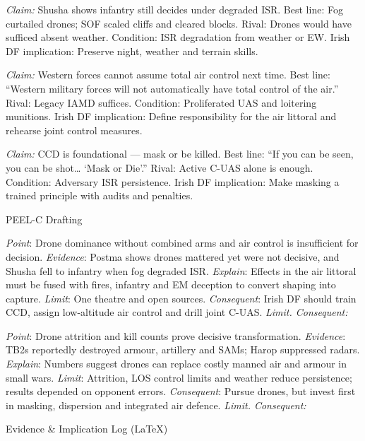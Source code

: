 \textit{Claim:} Shusha shows infantry still decides under degraded ISR.
Best line: Fog curtailed drones; SOF scaled cliffs and cleared blocks. Rival: Drones would have sufficed absent weather. Condition: ISR degradation from weather or EW. Irish DF implication: Preserve night, weather and terrain skills.

\textit{Claim:} Western forces cannot assume total air control next time.
Best line: “Western military forces will not automatically have total control of the air.” Rival: Legacy IAMD suffices. Condition: Proliferated UAS and loitering munitions. Irish DF implication: Define responsibility for the air littoral and rehearse joint control measures.

\textit{Claim:} CCD is foundational — mask or be killed.
Best line: “If you can be seen, you can be shot… ‘Mask or Die’.” Rival: Active C\hyp UAS alone is enough. Condition: Adversary ISR persistence. Irish DF implication: Make masking a trained principle with audits and penalties.

PEEL-C Drafting

\textit{Point}: Drone dominance without combined arms and air control is insufficient for decision.
\textit{Evidence}: Postma shows drones mattered yet were not decisive, and Shusha fell to infantry when fog degraded ISR.
\textit{Explain}: Effects in the air littoral must be fused with fires, infantry and EM deception to convert shaping into capture.
\textit{Limit}: One theatre and open sources.
\textit{Consequent}: Irish DF should train CCD, assign low-altitude air control and drill joint C\hyp UAS.
\textit{Limit. Consequent:}

\textit{Point}: Drone attrition and kill counts prove decisive transformation.
\textit{Evidence}: TB2s reportedly destroyed armour, artillery and SAMs; Harop suppressed radars.
\textit{Explain}: Numbers suggest drones can replace costly manned air and armour in small wars.
\textit{Limit}: Attrition, LOS control limits and weather reduce persistence; results depended on opponent errors.
\textit{Consequent}: Pursue drones, but invest first in masking, dispersion and integrated air defence.
\textit{Limit. Consequent:}

Evidence & Implication Log (LaTeX)

